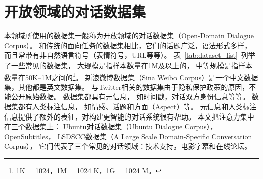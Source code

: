 \section{开放领域的对话数据集}\label{sec:public_dataset}
本领域所使用的数据集一般称为开放领域的对话数据集（Open-Domain Dialogue Corpus）。
和传统的面向任务的数据集相比，它们的话题广泛，语法形式多样，
而且常带有非自然语言符号（表情符号，URL等等）。
表~\ref{tab:dataset_list}~列举了一些常见的数据集，
大规模是指样本数量在1M及以上的，
中等规模是指样本数量在50K--1M之间的\footnote{1K = 1024，1M = 1024 K，1G = 1024 M。}。
新浪微博数据集（Sina Weibo Corpus）是一个中文数据集，其他都是英文数据集。
与Twitter相关的数据集由于隐私保护政策的原因，不能公开原始数据。
数据集都具有元信息，
如时间戳，对话双方身份信息等等。
数据集都有人类标注信息，
如情感、话题和方面（Aspect）等。
元信息和人类标注信息提供了额外的表征，对构建更智能的对话系统很有帮助。
本文把注意力集中在三个数据集上：
Ubuntu对话数据集（Ubuntu Dialogue Corpus），OpenSubtitles，
LSDSCC数据集（A Large Scale Domain-Specific Conversation Corpus），
它们代表了三个常见的对话领域：技术支持，电影字幕和在线论坛。
